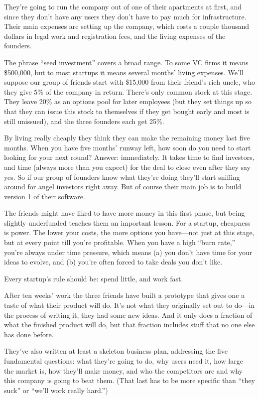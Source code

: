 They're going to run the company out of one of their apartments at
first, and since they don't have any users they don't have to pay much
for infrastructure. Their main expenses are setting up the company,
which costs a couple thousand dollars in legal work and registration
fees, and the living expenses of the founders.

The phrase ``seed investment'' covers a broad range. To some VC firms it
means \$500,000, but to most startups it means several months' living
expenses. We'll suppose our group of friends start with \$15,000 from
their friend's rich uncle, who they give 5\% of the company in return.
There's only common stock at this stage. They leave 20\% as an options
pool for later employees (but they set things up so that they can issue
this stock to themselves if they get bought early and most is still
unissued), and the three founders each get 25\%.

By living really cheaply they think they can make the remaining money
last five months. When you have five months' runway left, how soon do
you need to start looking for your next round? Answer: immediately. It
takes time to find investors, and time (always more than you expect) for
the deal to close even after they say yes. So if our group of founders
know what they're doing they'll start sniffing around for angel
investors right away. But of course their main job is to build version 1
of their software.

The friends might have liked to have more money in this first phase, but
being slightly underfunded teaches them an important lesson. For a
startup, cheapness is power. The lower your costs, the more options you
have---not just at this stage, but at every point till you're
profitable. When you have a high ``burn rate,'' you're always under time
pressure, which means (a) you don't have time for your ideas to evolve,
and (b) you're often forced to take deals you don't like.

Every startup's rule should be: spend little, and work fast.

After ten weeks' work the three friends have built a prototype that
gives one a taste of what their product will do. It's not what they
originally set out to do---in the process of writing it, they had some
new ideas. And it only does a fraction of what the finished product will
do, but that fraction includes stuff that no one else has done before.

They've also written at least a skeleton business plan, addressing the
five fundamental questions: what they're going to do, why users need it,
how large the market is, how they'll make money, and who the competitors
are and why this company is going to beat them. (That last has to be
more specific than ``they suck'' or ``we'll work really hard.'')

